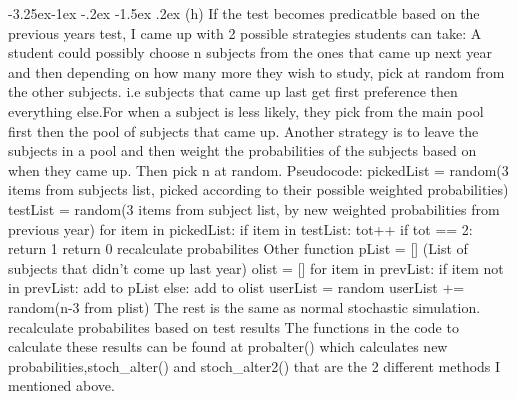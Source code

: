 \documentclass[10pt]{article} %
\makeatletter
\renewcommand\subsection{\@startsection{subsection}{2}{\z@}%
                                     {-3.25ex\@plus -1ex \@minus -.2ex}%
                                     {-1.5ex \@plus .2ex}%
                                     {\normalfont\large\bfseries}}
\makeatother
\begin{document}
\subsection{(h)}
If the test becomes predicatble based on the previous years test, I came up with 2 possible strategies students can take:
\newline
A student could possibly choose n subjects from the ones that came up next year and then depending on how many more they wish to study, pick at random from the other subjects. i.e subjects that came up last get first preference then everything else.For when a subject is less likely, they pick from the main pool first then the pool of subjects that came up.
\newline
Another strategy is to leave the subjects in a pool and then weight the probabilities of the subjects based on when they came up. Then pick n at random.
\newline
Pseudocode:
\newline
pickedList = random(3 items from subjects list, picked according to their possible weighted probabilities)
\newline
testList  =  random(3 items from subject list, by new weighted probabilities from previous year)
\newline for item in pickedList:
\newline
	\indent if item in testList: tot++
	\newline
	\indent if tot == 2: return 1
	\newline
return 0 
\newline recalculate probabilites
\newline
Other function\newline
pList = [] (List of subjects that didn't come up last year)\newline
olist = []
for item in prevList:
\newline \indent if item not in prevList: add to pList \newline
\indent else: add to olist \newline
userList = random \newline
userList += random(n-3 from plist) \newline
The rest is the same as  normal stochastic simulation.\newline
recalculate probabilites based on test results\newline
The functions in the code to calculate these results can be found at probalter() which calculates new probabilities,stoch\_alter() and stoch\_alter2() that are the 2 different methods I mentioned above.\newline
\end{document}
